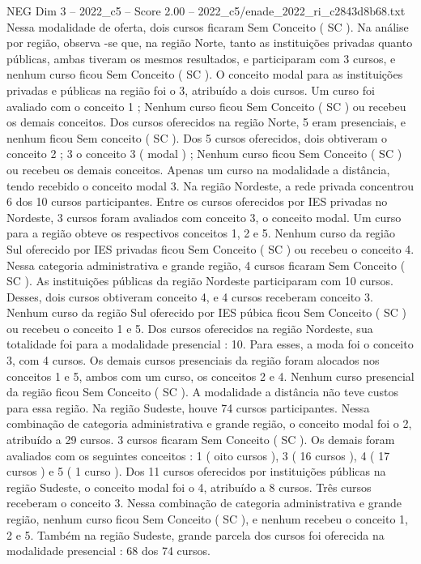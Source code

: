 \begin{textsample}{NEG Dim 3 – 2022\_c5 – Score 2.00 – 2022\_c5/enade\_2022\_ri\_c2843d8b68.txt}
Nessa modalidade de oferta, dois cursos ficaram Sem Conceito ( SC ).
Na análise por região, observa -se que, na região Norte, tanto as instituições privadas quanto públicas, ambas tiveram os mesmos resultados, e participaram com 3 cursos, e nenhum curso ficou Sem Conceito ( SC ).
O conceito modal para as instituições privadas e públicas na região foi o 3, atribuído a dois cursos.
Um curso foi avaliado com o conceito 1 ; Nenhum curso ficou Sem Conceito ( SC ) ou recebeu os demais conceitos.
Dos cursos oferecidos na região Norte, 5 eram presenciais, e nenhum ficou Sem conceito ( SC ).
Dos 5 cursos oferecidos, dois obtiveram o conceito 2 ; 3 o conceito 3 ( modal ) ; Nenhum curso ficou Sem Conceito ( SC ) ou recebeu os demais conceitos.
Apenas um curso na modalidade a distância, tendo recebido o conceito modal 3.
Na região Nordeste, a rede privada concentrou 6 dos 10 cursos participantes.
Entre os cursos oferecidos por IES privadas no Nordeste, 3 cursos foram avaliados com conceito 3, o conceito modal.
Um curso para a região obteve os respectivos conceitos 1, 2 e 5.
Nenhum curso da região Sul oferecido por IES privadas ficou Sem Conceito ( SC ) ou recebeu o conceito 4.
Nessa categoria administrativa e grande região, 4 cursos ficaram Sem Conceito ( SC ).
As instituições públicas da região Nordeste participaram com 10 cursos.
Desses, dois cursos obtiveram conceito 4, e 4 cursos receberam conceito 3.
Nenhum curso da região Sul oferecido por IES púbica ficou Sem Conceito ( SC ) ou recebeu o conceito 1 e 5.
Dos cursos oferecidos na região Nordeste, sua totalidade foi para a modalidade presencial : 10.
Para esses, a moda foi o conceito 3, com 4 cursos.
Os demais cursos presenciais da região foram alocados nos conceitos 1 e 5, ambos com um curso, os conceitos 2 e 4.
Nenhum curso presencial da região ficou Sem Conceito ( SC ).
A modalidade a distância não teve custos para essa região.
Na região Sudeste, houve 74 cursos participantes.
Nessa combinação de categoria administrativa e grande região, o conceito modal foi o 2, atribuído a 29 cursos. 3 cursos ficaram Sem Conceito ( SC ).
Os demais foram avaliados com os seguintes conceitos : 1 ( oito cursos ), 3 ( 16 cursos ), 4 ( 17 cursos ) e 5 ( 1 curso ).
Dos 11 cursos oferecidos por instituições públicas na região Sudeste, o conceito modal foi o 4, atribuído a 8 cursos.
Três cursos receberam o conceito 3.
Nessa combinação de categoria administrativa e grande região, nenhum curso ficou Sem Conceito ( SC ), e nenhum recebeu o conceito 1, 2 e 5.
Também na região Sudeste, grande parcela dos cursos foi oferecida na modalidade presencial : 68 dos 74 cursos.

\end{textsample}
